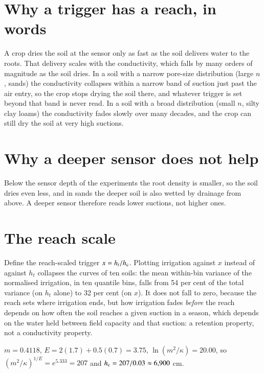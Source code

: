 \section{Why a trigger has a reach, in words}
A crop dries the soil at the sensor only as fast as the soil delivers water to the roots. That delivery scales with the conductivity, which falls by many orders of magnitude as the soil dries. In a soil with a narrow pore-size distribution (large $n$, sands) the conductivity collapses within a narrow band of suction just past the air entry, so the crop stops drying the soil there, and whatever trigger is set beyond that band is never read. In a soil with a broad distribution (small $n$, silty clay loams) the conductivity fades slowly over many decades, and the crop can still dry the soil at very high suctions.

\section{Why a deeper sensor does not help}
Below the sensor depth of the experiments the root density is smaller, so the soil dries even less, and in sands the deeper soil is also wetted by drainage from above. A deeper sensor therefore reads lower suctions, not higher ones.

\section{The reach scale}
Define the reach-scaled trigger $x=h_t/h_{\mathrm c}$. Plotting irrigation against $x$ instead of against $h_t$ collapses the curves of ten soils: the mean within-bin variance of the normalised irrigation, in ten quantile bins, falls from 54 per cent of the total variance (on $h_t$ alone) to 32 per cent (on $x$). It does not fall to zero, because the reach sets where irrigation ends, but how irrigation fades \emph{before} the reach depends on how often the soil reaches a given suction in a season, which depends on the water held between field capacity and that suction: a retention property, not a conductivity property.

\label{fig:reachscale}

\sol  $m=0.4118$, $E=2(1.7)+0.5(0.7)=3.75$, $\ln(m^2/\kappa)=20.00$, so $(m^2/\kappa)^{1/E}=e^{5.333}=207$ and $h_{\mathrm c}=207/0.03\approx6{,}900$ cm.

